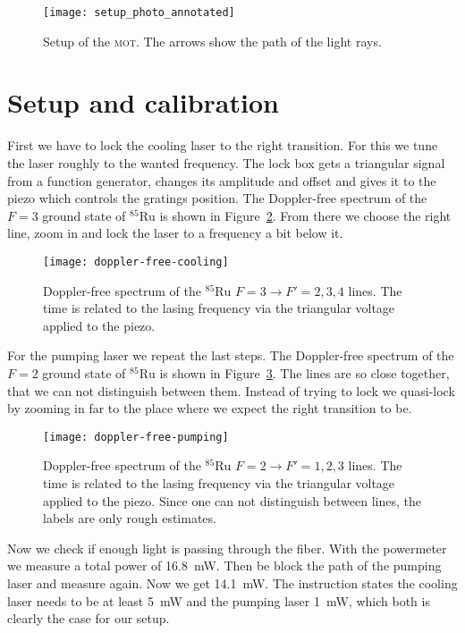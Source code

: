 \documentclass[11pt, english, fleqn, DIV=15, headinclude, BCOR=2cm]{scrreprt}
\newcommand\mot{\textsc{mot}}
\begin{document}
\begin{figure}
    \centering
    \texttt{[image: setup\_photo\_annotated]}
    \caption{%
        Setup of the \mot. The arrows show the path of the light rays. 
    }
    \label{fig:setup_photo_annotated}
\end{figure}

\section{Setup and calibration}

First we have to lock the cooling laser to the right transition. For this we
tune the laser roughly to the wanted frequency. The lock box gets a triangular
signal from a function generator, changes its amplitude and offset and gives it
to the piezo which controls the gratings position. The Doppler-free spectrum of
the $F=3$ ground state of ${}^{85}\text{Ru}$ is shown in
Figure~\ref{fig:doppler-free-cooling}. From there we choose the right line,
zoom in and lock the laser to a frequency a bit below it. 

\begin{figure}
    \centering
    \texttt{[image: doppler-free-cooling]}
    \caption{%
        Doppler-free spectrum of the ${}^{85}\text{Ru}$ $F=3 \to F'=2,3,4$
        lines. The time is related to the lasing frequency via the triangular
        voltage applied to the piezo.
    }
    \label{fig:doppler-free-cooling}
\end{figure}

For the pumping laser we repeat the last steps. The Doppler-free spectrum of the
$F=2$ ground state of ${}^{85}\text{Ru}$ is shown in
Figure~\ref{fig:doppler-free-pumping}. The lines are so close together, that we
can not distinguish between them. Instead of trying to lock we quasi-lock by
zooming in far to the place where we expect the right transition to be.

\begin{figure}
    \centering
    \texttt{[image: doppler-free-pumping]}
    \caption{%
        Doppler-free spectrum of the ${}^{85}\text{Ru}$ $F=2 \to F'=1,2,3$
        lines. The time is related to the lasing frequency via the triangular
        voltage applied to the piezo. Since one can not distinguish between
        lines, the labels are only rough estimates. 
    }
    \label{fig:doppler-free-pumping}
\end{figure}

Now we check if enough light is passing through the fiber. With the
powermeter we measure a total power of \SI{16.8}{\milli\watt}. Then be block
the path of the pumping laser and measure again. Now we get
\SI{14.1}{\milli\watt}. The instruction states the cooling laser needs to be at
least \SI{5}{\milli\watt} and the pumping laser \SI{1}{\milli\watt}, which both
is clearly the case for our setup.
\end{document}
